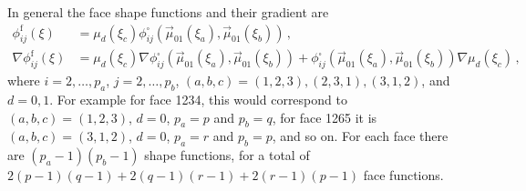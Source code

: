 In general the face shape functions and their gradient are
\begin{equation}
	\begin{aligned}
		\phi_{ij}^\mathrm{f}(\xi)&=\mu_d(\xi_c)\phi_{ij}^\square(\vec{\mu}_{01}(\xi_a),\vec{\mu}_{01}(\xi_b))\,,\\
		\nabla\phi_{ij}^\mathrm{f}(\xi)&=\mu_d(\xi_c)\nabla\phi_{ij}^\square(\vec{\mu}_{01}(\xi_a),\vec{\mu}_{01}(\xi_b))
			+\phi_{ij}^\square(\vec{\mu}_{01}(\xi_a),\vec{\mu}_{01}(\xi_b))\nabla\mu_d(\xi_c)\,,
	\end{aligned}
	\label{eq:Hexaphifacegeneral}
\end{equation}
where $i=2,\ldots,p_a$, $j=2,\ldots,p_b$, $(a,b,c)=(1,2,3),(2,3,1),(3,1,2)$, and $d=0,1$.
For example for face 1234, this would correspond to $(a,b,c)=(1,2,3)$, $d=0$, $p_a=p$ and $p_b=q$, for face 1265 it is $(a,b,c)=(3,1,2)$, $d=0$, $p_a=r$ and $p_b=p$, and so on. 
For each face there are $(p_a-1)(p_b-1)$ shape functions, for a total of $2(p-1)(q-1)+2(q-1)(r-1)+2(r-1)(p-1)$ face functions.



